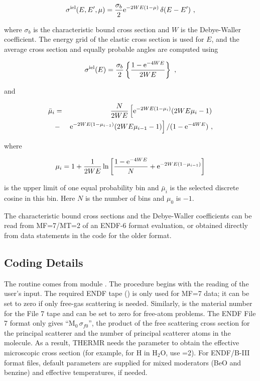 \begin{equation}
   \sigma^{\rm iel}(E,E',\mu)=\frac{\sigma_b}{2}
     {\rm e}^{-2WE(1-\mu)}\,\delta(E-E')\,\,,
\end{equation}

\noindent
where $\sigma_b$ is the characteristic bound cross section and $W$ is the
Debye-Waller coefficient.  The energy grid
of the elastic cross section is used for $E$, and the average cross
section and equally probable angles are computed using

\begin{equation}
   \sigma^{\rm iel}(E)=\frac{\sigma_b}{2}\left\{
     \frac{1-{\rm e}^{-4WE}}{2WE}\right\}\,\,,
\end{equation}

\noindent
and

\begin{eqnarray}
   \bar{\mu}_i&=&\frac{N}{2WE}\left[
      {\rm e}^{-2WE(1-\mu_i)}(2WE\mu_i-1)\right.\nonumber\\
      &-&\left.{\rm e}^{-2WE(1-\mu_{i-1})}(2WE\mu_{i-1}-1)
      \right]/(1-{\rm e}^{-4WE})\,\,,
\end{eqnarray}

\noindent
where

\begin{equation}
   \mu_i=1+\frac{1}{2WE}\ln\left[
       \frac{1-{\rm e}^{-4WE}}{N}+{\rm e}^{-2WE(1-\mu_{i-1})}
        \right]
\end{equation}

\noindent
is the upper limit of one equal probability bin and $\bar{\mu}_i$ is
the selected discrete cosine in this bin.  Here $N$ is the number of bins
and $\mu_0$ is $-1$.

The characteristic bound cross sections and the Debye-Waller coefficients
can be read from MF=7/MT=2 of an ENDF-6 format evaluation, or obtained
directly from data statements in the code for the older format.

\subsection{Coding Details}
\label{ssTHERMR_details}

The  routine comes from
module .  The
procedure begins with the reading of the user's input.
The required ENDF tape () is only used for MF=7 data;
it can be set to zero if only free-gas scattering is needed.  Similarly,
 is the material number for the File 7 tape and can be
set to zero for free-atom problems.  The ENDF File 7 format only
gives ``M$_0\,\sigma_{f0}$'', the product of the free scattering cross
section for the principal scatterer and the number of principal scatterer
atoms in the molecule.  As a result, THERMR needs the parameter
 to obtain the effective microscopic cross section
(for example, for H in H$_2$O, use =2).  For ENDF/B-III
format files, default parameters are supplied for mixed moderators
(BeO and benzine) and effective temperatures, if needed.

